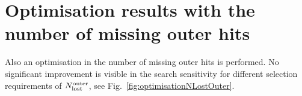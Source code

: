 \FloatBarrier
\section{Optimisation results with the number of missing outer hits}
\label{app:OptimisationNLostOuter}

Also an optimisation in the number of missing outer hits is performed. 
No significant improvement is visible in the search sensitivity for different selection requirements of $N_{\text{lost}}^{\text{outer}}$, see Fig.~\ref{fig:optimisationNLostOuter}.  
